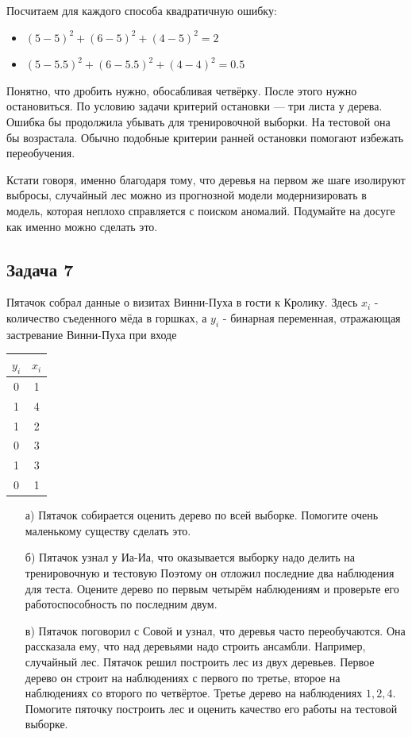 \documentclass[12pt, a4paper, oneside]{article}
\theoremstyle{plain} %
\theoremstyle{definition}
\begin{document}
{	Посчитаем для каждого способа квадратичную ошибку: 
	
	\begin{itemize}
		\item  $ (5 - 5)^2 + (6 - 5)^2 + (4 - 5)^2 = 2$
		\item  $ (5 - 5.5)^2 + (6 - 5.5)^2 + (4 - 4)^2  = 0.5$
	\end{itemize}
	
	Понятно, что дробить нужно, обосабливая четвёрку. После этого нужно остановиться. По условию задачи критерий остановки --- три листа у дерева. Ошибка бы продолжила убывать для тренировочной выборки. На тестовой она бы возрастала. Обычно подобные критерии ранней остановки помогают избежать переобучения.
	
	Кстати говоря, именно благодаря тому, что деревья на первом же шаге изолируют выбросы, случайный лес можно из прогнозной модели модернизировать в модель, которая неплохо справляется с поиском аномалий. Подумайте на досуге как именно можно сделать это. 
}


\subsection*{Задача 7}

Пятачок собрал данные о визитах Винни-Пуха в гости к Кролику. Здесь $x_i$ - количество съеденного мёда в горшках, а $y_i$  - бинарная переменная, отражающая застревание Винни-Пуха при входе 

\begin{center}
	\begin{tabular}{c|c}
		$y_i$ & $x_i$ \\
		\hline
		0  & 1 \\
		1 & 4\\
		1 & 2\\
		0 & 3 \\
		1 & 3 \\
		0 & 1
	\end{tabular}
\end{center}

\begin{enumerate}
	\item[а)] Пятачок собирается оценить дерево по всей выборке.  Помогите очень маленькому существу сделать это. 
	\item[б)] Пятачок узнал у Иа-Иа, что оказывается выборку надо делить на тренировочную и тестовую Поэтому он отложил последние два наблюдения для теста. Оцените дерево по первым четырём наблюдениям и проверьте его работоспособность по последним двум. 
	\item[в)]  Пятачок поговорил с Совой и узнал, что деревья часто переобучаются. Она рассказала ему, что над деревьями надо строить ансамбли. Например, случайный лес. Пятачок решил построить лес из двух деревьев. Первое дерево он строит на наблюдениях с первого по третье, второе на наблюдениях со второго по четвёртое.  Третье дерево на наблюдениях $1,2,4$. Помогите пяточку построить лес и оценить качество его работы на тестовой выборке. 
	
\end{enumerate}
\end{document}
